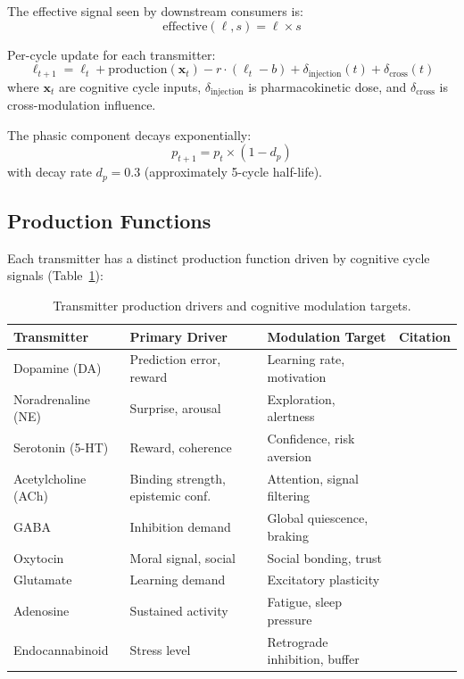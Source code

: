 \documentclass[11pt,a4paper]{article}
\begin{document}
The effective signal seen by downstream consumers is:
\begin{equation}
  \text{effective}(\ell, s) = \ell \times s
\end{equation}

\noindent Per-cycle update for each transmitter:
\begin{equation}
  \ell_{t+1} = \ell_t + \text{production}(\mathbf{x}_t) - r \cdot (\ell_t - b) + \delta_{\text{injection}}(t) + \delta_{\text{cross}}(t)
\end{equation}
where $\mathbf{x}_t$ are cognitive cycle inputs, $\delta_{\text{injection}}$ is pharmacokinetic dose, and $\delta_{\text{cross}}$ is cross-modulation influence.

The phasic component decays exponentially:
\begin{equation}
  p_{t+1} = p_t \times (1 - d_p)
\end{equation}
with decay rate $d_p = 0.3$ (approximately 5-cycle half-life).

\subsection{Production Functions}

Each transmitter has a distinct production function driven by cognitive cycle signals (Table~\ref{tab:production}):

\begin{table}[h]
\centering
\caption{Transmitter production drivers and cognitive modulation targets.}
\label{tab:production}
\begin{tabular}{llll}
\toprule
\textbf{Transmitter} & \textbf{Primary Driver} & \textbf{Modulation Target} & \textbf{Citation} \\
\midrule
Dopamine (DA) & Prediction error, reward & Learning rate, motivation & \citet{schultz1997} \\
Noradrenaline (NE) & Surprise, arousal & Exploration, alertness & \citet{aston-jones2005} \\
Serotonin (5-HT) & Reward, coherence & Confidence, risk aversion & \citet{doya2002} \\
Acetylcholine (ACh) & Binding strength, epistemic conf. & Attention, signal filtering & \citet{hasselmo2006} \\
GABA & Inhibition demand & Global quiescence, braking & \citet{olsen2009} \\
Oxytocin & Moral signal, social & Social bonding, trust & \citet{kosfeld2005} \\
Glutamate & Learning demand & Excitatory plasticity & \citet{olney1969} \\
Adenosine & Sustained activity & Fatigue, sleep pressure & \citet{porkka-heiskanen1997} \\
Endocannabinoid & Stress level & Retrograde inhibition, buffer & \citet{piomelli2003} \\
\bottomrule
\end{tabular}
\end{table}
\end{document}
